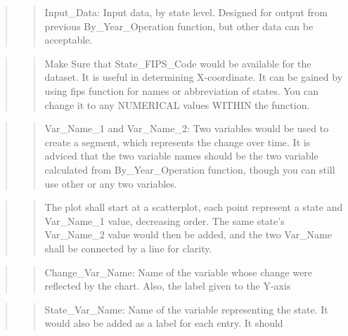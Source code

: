\documentclass[
]{article}
\begin{document}
\begin{quote}
\begin{quote}
Input\_Data: Input data, by state level. Designed for output from
previous By\_Year\_Operation function, but other data can be acceptable.
\end{quote}
\end{quote}

\begin{quote}
\begin{quote}
Make Sure that State\_FIPS\_Code would be available for the dataset. It
is useful in determining X-coordinate. It can be gained by using fips
function for names or abbreviation of states. You can change it to any
NUMERICAL values WITHIN the function.
\end{quote}
\end{quote}

\begin{quote}
\begin{quote}
Var\_Name\_1 and Var\_Name\_2: Two variables would be used to create a
segment, which represents the change over time. It is adviced that the
two variable names should be the two variable calculated from
By\_Year\_Operation function, though you can still use other or any two
variables.
\end{quote}
\end{quote}

\begin{quote}
\begin{quote}
The plot shall start at a scatterplot, each point represent a state and
Var\_Name\_1 value, decreasing order. The same state's Var\_Name\_2
value would then be added, and the two Var\_Name shall be connected by a
line for clarity.
\end{quote}
\end{quote}

\begin{quote}
\begin{quote}
Change\_Var\_Name: Name of the variable whose change were reflected by
the chart. Also, the label given to the Y-axis
\end{quote}
\end{quote}

\begin{quote}
\begin{quote}
State\_Var\_Name: Name of the variable representing the state. It would
also be added as a label for each entry. It should
\end{quote}
\end{quote}
\end{document}
